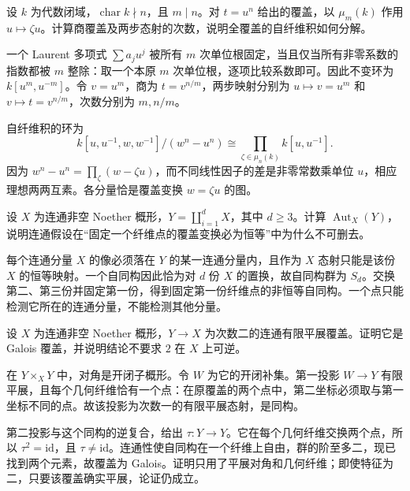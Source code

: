 \begin{exercise}\label{b3:ex:I-power-cover-intermediate}
	设 \(k\) 为代数闭域，\(\operatorname{char}k\nmid n\)，且 \(m\mid n\)。对 \(t=u^n\) 给出的覆盖，以 \(\mu_m(k)\) 作用 \(u\mapsto\zeta u\)。计算商覆盖及两步态射的次数，说明全覆盖的自纤维积如何分解。
\end{exercise}
\begin{solution}
	一个 Laurent 多项式 \(\sum a_j u^j\) 被所有 \(m\) 次单位根固定，当且仅当所有非零系数的指数都被 \(m\) 整除：取一个本原 \(m\) 次单位根，逐项比较系数即可。因此不变环为 \(k[u^m,u^{-m}]\)。令 \(v=u^m\)，商为 \(t=v^{n/m}\)，两步映射分别为 \(u\mapsto v=u^m\) 和 \(v\mapsto t=v^{n/m}\)，次数分别为 \(m,n/m\)。

	自纤维积的环为
	\[
		k[u,u^{-1},w,w^{-1}]/(w^n-u^n)
		\cong\prod_{\zeta\in\mu_n(k)}k[u,u^{-1}].
	\]
	因为 \(w^n-u^n=\prod_\zeta(w-\zeta u)\)，而不同线性因子的差是非零常数乘单位 \(u\)，相应理想两两互素。各分量恰是覆盖变换 \(w=\zeta u\) 的图。
\end{solution}

\begin{exercise}\label{b3:ex:I-constant-cover-automorphisms}
	设 \(X\) 为连通非空 Noether 概形，\(Y=\coprod_{i=1}^{d}X\)，其中 \(d\ge3\)。计算 \(\operatorname{Aut}_X(Y)\)，说明连通假设在“固定一个纤维点的覆盖变换必为恒等”中为什么不可删去。
\end{exercise}
\begin{solution}
	每个连通分量 \(X\) 的像必须落在 \(Y\) 的某一连通分量内，且作为 \(X\) 态射只能是该份 \(X\) 的恒等映射。一个自同构因此恰为对 \(d\) 份 \(X\) 的置换，故自同构群为 \(S_d\)。交换第二、第三份并固定第一份，得到固定第一份纤维点的非恒等自同构。一个点只能检测它所在的连通分量，不能检测其他分量。
\end{solution}

\begin{exercise}\label{b3:ex:I-two-sheet-galois}
	设 \(X\) 为连通非空 Noether 概形，\(Y\rightarrow X\) 为次数二的连通有限平展覆盖。证明它是 Galois 覆盖，并说明结论不要求 \(2\) 在 \(X\) 上可逆。
\end{exercise}
\begin{solution}
	在 \(Y\times_XY\) 中，对角是开闭子概形。令 \(W\) 为它的开闭补集。第一投影 \(W\rightarrow Y\) 有限平展，且每个几何纤维恰有一个点：在原覆盖的两个点中，第二坐标必须取与第一坐标不同的点。故该投影为次数一的有限平展态射，是同构。

	第二投影与这个同构的逆复合，给出 \(\tau:Y\rightarrow Y\)。它在每个几何纤维交换两个点，所以 \(\tau^2=\mathrm{id}\)，且 \(\tau\ne\mathrm{id}\)。连通性使自同构在一个纤维上自由，群的阶至多二，现已找到两个元素，故覆盖为 Galois。证明只用了平展对角和几何纤维；即使特征为二，只要该覆盖确实平展，论证仍成立。
\end{solution}

